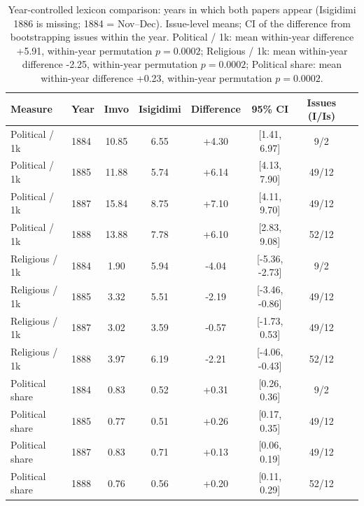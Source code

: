 \begin{table}[h]\centering\small\caption{Year-controlled lexicon comparison: years in which both papers appear (Isigidimi 1886 is missing; 1884 = Nov--Dec). Issue-level means; CI of the difference from bootstrapping issues within the year. Political / 1k: mean within-year difference +5.91, within-year permutation $p=0.0002$; Religious / 1k: mean within-year difference -2.25, within-year permutation $p=0.0002$; Political share: mean within-year difference +0.23, within-year permutation $p=0.0002$.}
\begin{tabular}{@{}llcccccc@{}}\toprule Measure & Year & Imvo & Isigidimi & Difference & 95\% CI & Issues (I/Is) \\ \midrule
Political / 1k & 1884 & 10.85 & 6.55 & +4.30 & [1.41, 6.97] & 9/2 \\
Political / 1k & 1885 & 11.88 & 5.74 & +6.14 & [4.13, 7.90] & 49/12 \\
Political / 1k & 1887 & 15.84 & 8.75 & +7.10 & [4.11, 9.70] & 49/12 \\
Political / 1k & 1888 & 13.88 & 7.78 & +6.10 & [2.83, 9.08] & 52/12 \\
Religious / 1k & 1884 & 1.90 & 5.94 & -4.04 & [-5.36, -2.73] & 9/2 \\
Religious / 1k & 1885 & 3.32 & 5.51 & -2.19 & [-3.46, -0.86] & 49/12 \\
Religious / 1k & 1887 & 3.02 & 3.59 & -0.57 & [-1.73, 0.53] & 49/12 \\
Religious / 1k & 1888 & 3.97 & 6.19 & -2.21 & [-4.06, -0.43] & 52/12 \\
Political share & 1884 & 0.83 & 0.52 & +0.31 & [0.26, 0.36] & 9/2 \\
Political share & 1885 & 0.77 & 0.51 & +0.26 & [0.17, 0.35] & 49/12 \\
Political share & 1887 & 0.83 & 0.71 & +0.13 & [0.06, 0.19] & 49/12 \\
Political share & 1888 & 0.76 & 0.56 & +0.20 & [0.11, 0.29] & 52/12 \\
\bottomrule\end{tabular}\label{tab:yearlex}\end{table}
